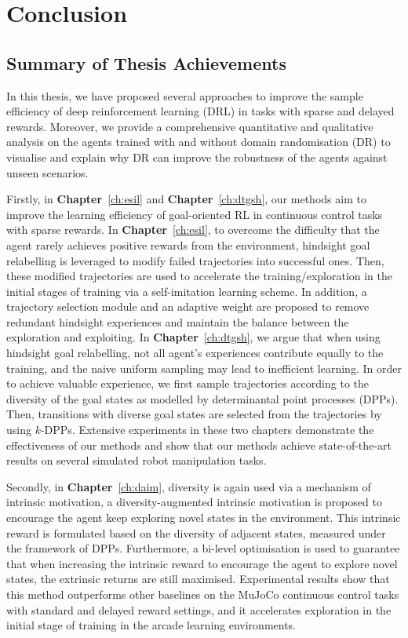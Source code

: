 \chapter{Conclusion}

\label{ch:conclusions}

\section{Summary of Thesis Achievements}
In this thesis, we have proposed several approaches to improve the sample efficiency of deep reinforcement learning (DRL) in tasks with sparse and delayed rewards. Moreover, we provide a comprehensive quantitative and qualitative analysis on the agents trained with and without domain randomisation (DR) to visualise and explain why DR can improve the robustness of the agents against unseen scenarios. 

Firstly, in \textbf{Chapter}~\ref{ch:esil} and \textbf{Chapter}~\ref{ch:dtgsh}, our methods aim to improve the learning efficiency of goal-oriented RL in continuous control tasks with sparse rewards. In \textbf{Chapter}~\ref{ch:esil}, to overcome the difficulty that the agent rarely achieves positive rewards from the environment, hindsight goal relabelling is leveraged to modify failed trajectories into successful ones. Then, these modified trajectories are used to accelerate the training/exploration in the initial stages of training via a self-imitation learning scheme. In addition, a trajectory selection module and an adaptive weight are proposed to remove redundant hindsight experiences and maintain the balance between the exploration and exploiting. In \textbf{Chapter}~\ref{ch:dtgsh}, we argue that when using hindsight goal relabelling, not all agent's experiences contribute equally to the training, and the naive uniform sampling may lead to inefficient learning. In order to achieve valuable experience, we first sample trajectories according to the diversity of the goal states as modelled by determinantal point processes (DPPs). Then, transitions with diverse goal states are selected from the trajectories by using $k$-DPPs. Extensive experiments in these two chapters demonstrate the effectiveness of our methods and show that our methods achieve state-of-the-art results on several simulated robot manipulation tasks.

Secondly, in \textbf{Chapter}~\ref{ch:daim}, diversity is again used via a mechanism of intrinsic motivation, a diversity-augmented intrinsic motivation is proposed to encourage the agent keep exploring novel states in the environment. This intrinsic reward is formulated based on the diversity of adjacent states, measured under the framework of DPPs. Furthermore, a bi-level optimisation is used to guarantee that when increasing the intrinsic reward to encourage the agent to explore novel states, the extrinsic returns are still maximised. Experimental results show that this method outperforms other baselines on the MuJoCo continuous control tasks with standard and delayed reward settings, and it accelerates exploration in the initial stage of training in the arcade learning environments. 


